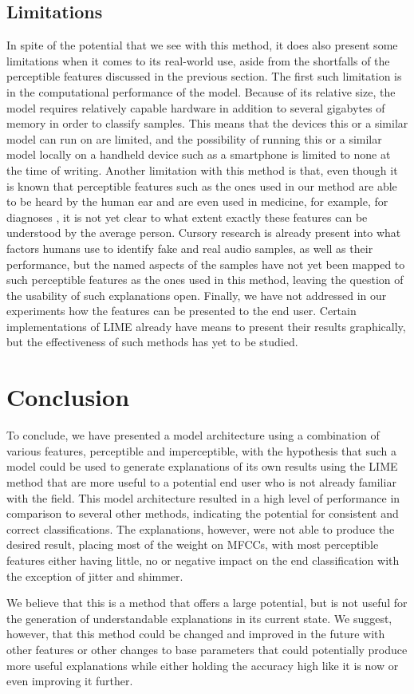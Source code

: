 \documentclass{article}
\begin{document}
		\subsection{Limitations}
		In spite of the potential that we see with this method, it does also present some
		limitations when it comes to its real-world use, aside from the shortfalls of the
		perceptible features discussed in the previous section. The first such limitation is in
		the computational performance of the model. Because of its relative size, the model
		requires relatively capable hardware in addition to several gigabytes of memory in order
		to classify samples. This means that the devices this or a similar model can run on are
		limited, and the possibility of running this or a similar model locally on a handheld
		device such as a smartphone is limited to none at the time of writing. Another limitation
		with this method is that, even though it is known that perceptible features such as the
		ones used in our method are able to be heard by the human ear and are even used in
		medicine, for example, for diagnoses \cite{chaiwongyen_deepfake-speech_2023}, it is not
		yet clear to what extent exactly these features can be understood by the average person.
		Cursory research \cite{sharevski_blind_2024} is already present into what factors humans
		use to identify fake and real audio samples, as well as their performance, but the named
		aspects of the samples have not yet been mapped to such perceptible features as the ones
		used in this method, leaving the question of the usability of such explanations open.
		Finally, we have not addressed in our experiments how the features can be presented to the
		end user. Certain implementations of LIME already have means to present their results
		graphically, but the effectiveness of such methods has yet to be studied.
	\section{Conclusion}
	To conclude, we have presented a model architecture using a combination of various features,
	perceptible and imperceptible, with the hypothesis that such a model could be used to generate
	explanations of its own results using the LIME method that are more useful to a potential end
	user who is not already familiar with the field. This model architecture resulted in a high
	level of performance in comparison to several other methods, indicating the potential for
	consistent and correct classifications. The explanations, however, were not able to produce
	the desired result, placing most of the weight on MFCCs, with most perceptible features either
	having little, no or negative impact on the end classification with the exception of jitter
	and shimmer.
	\par
	We believe that this is a method that offers a large potential, but is not useful for the
	generation of understandable explanations in its current state. We suggest, however, that this
	method could be changed and improved in the future with other features or other changes to
	base parameters that could potentially produce more useful explanations while either holding
	the accuracy high like it is now or even improving it further.
	\newpage
	\sloppy
	\printbibliography
\end{document}
